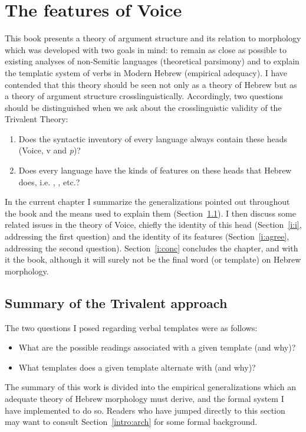 \chapter{The features of Voice}
\label{chap:i}

This book presents a theory of argument structure and its relation to morphology which was developed with two goals in mind: to remain as close as possible to existing analyses of non-Semitic languages (theoretical parsimony) and to explain the templatic system of verbs in Modern Hebrew (empirical adequacy). I have contended that this theory should be seen not only as a theory of Hebrew but as a theory of argument structure crosslinguistically. Accordingly, two questions should be distinguished when we ask about the crosslinguistic validity of the Trivalent Theory:
\begin{enumerate}
	\item Does the syntactic inventory of every language always contain these heads (Voice, v and \emph{p})?
	\item Does every language have the kinds of features on these heads that Hebrew does, i.e. {\vd}, \pz, etc.?
\end{enumerate}

In the current chapter I summarize the generalizations pointed out throughout the book and the means used to explain them (Section~\ref{i:sum}). I then discuss some related issues in the theory of Voice, chiefly the identity of this head (Section~\ref{i:i}, addressing the first question) and the identity of its features (Section~\ref{i:agree}, addressing the second question). Section~\ref{i:conc} concludes the chapter, and with it the book, although it will surely not be the final word (or template) on Hebrew morphology.


\section{Summary of the Trivalent approach} \label{i:sum}
The two questions I posed regarding verbal templates were as follows:
\begin{itemize}
	\item What are the possible readings associated with a given template (and why)?
	\item What templates does a given template alternate with (and why)?
\end{itemize}

The summary of this work is divided into the empirical generalizations which an adequate theory of Hebrew morphology must derive, and the formal system I have implemented to do so. Readers who have jumped directly to this section may want to consult Section~\ref{intro:arch} for some formal background.

